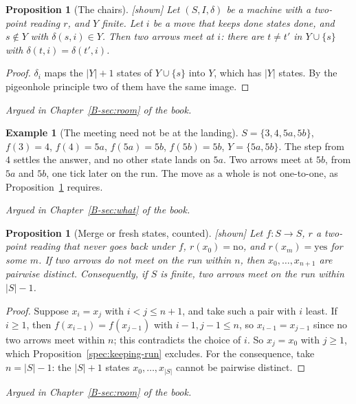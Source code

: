 \documentclass[11pt, a4paper]{article}
\theoremstyle{plain}
\newtheorem{proposition}[theorem]{Proposition}
\theoremstyle{definition}
\newtheorem{example}[theorem]{Example}
\theoremstyle{remark}
\newcommand{\step}{\delta}
\newcommand{\rd}{r}
\newcommand{\argued}[1]{\par\noindent\textit{Argued in Chapter~\ref{B-#1} of the book.}\par}
\newcommand{\kind}[1]{\textup{[#1]}}
\begin{document}
\begin{proposition}[The chairs]\label{spec:chairs} \kind{shown}
Let $(S,I,\step)$ be a machine with a two-point reading $\rd$, and $Y$ finite. Let $i$ be a move that
keeps done states done, and $s\notin Y$ with $\step(s,i)\in Y$. Then two arrows meet at $i$: there are
$t\ne t'$ in $Y\cup\{s\}$ with $\step(t,i)=\step(t',i)$.
\end{proposition}

\begin{proof}
$\step_i$ maps the $|Y|+1$ states of $Y\cup\{s\}$ into $Y$, which has $|Y|$ states. By the pigeonhole
principle two of them have the same image.
\end{proof}

\argued{sec:room}

\begin{example}[The meeting need not be at the landing]\label{spec:5a5b}
$S=\{3,4,5a,5b\}$, $f(3)=4$, $f(4)=5a$, $f(5a)=5b$, $f(5b)=5b$, $Y=\{5a,5b\}$. The step from $4$ settles
the answer, and no other state lands on $5a$. Two arrows meet at $5b$, from $5a$ and $5b$, one tick
later on the run. The move as a whole is not one-to-one, as Proposition~\ref{spec:chairs} requires.
\end{example}

\argued{sec:what}

\begin{proposition}[Merge or fresh states, counted]\label{spec:run-fresh} \kind{shown}
Let $f:S\to S$, $\rd$ a two-point reading that never goes back under $f$, $\rd(x_0)=\mathrm{no}$, and
$\rd(x_m)=\mathrm{yes}$ for some $m$. If two arrows do not meet on the run within $n$, then
$x_0,\dots,x_{n+1}$ are pairwise distinct. Consequently, if $S$ is finite, two arrows meet on the run
within $|S|-1$.
\end{proposition}

\begin{proof}
Suppose $x_i=x_j$ with $i<j\le n+1$, and take such a pair with $i$ least. If $i\ge1$, then
$f(x_{i-1})=f(x_{j-1})$ with $i-1,j-1\le n$, so $x_{i-1}=x_{j-1}$ since no two arrows meet within $n$;
this contradicts the choice of $i$. So $x_j=x_0$ with $j\ge1$, which Proposition~\ref{spec:keeping-run}
excludes. For the consequence, take $n=|S|-1$: the $|S|+1$ states $x_0,\dots,x_{|S|}$ cannot be pairwise
distinct.
\end{proof}

\argued{sec:room}
\end{document}
